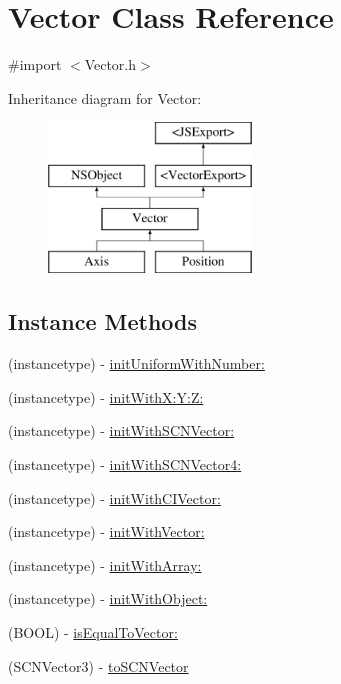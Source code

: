 \hypertarget{interface_vector}{}\section{Vector Class Reference}
\label{interface_vector}


{\ttfamily \#import $<$Vector.\+h$>$}

Inheritance diagram for Vector\+:\begin{figure}[H]
\begin{center}
\leavevmode
\includegraphics[height=4.000000cm]{interface_vector}
\end{center}
\end{figure}
\subsection*{Instance Methods}
\begin{DoxyCompactItemize}
\item 
(instancetype) -\/ \hyperlink{interface_vector_ab2f9f8cb5aed3938085bc658411084ac}{init\+Uniform\+With\+Number\+:}
\item 
(instancetype) -\/ \hyperlink{interface_vector_a678be7532656d3c2833b2acdb940be9b}{init\+With\+X\+:\+Y\+:\+Z\+:}
\item 
(instancetype) -\/ \hyperlink{interface_vector_a00a140fdfab0f2a9f511bfd9368b05c1}{init\+With\+S\+C\+N\+Vector\+:}
\item 
(instancetype) -\/ \hyperlink{interface_vector_a8ab40101d7921d728166653208d8b6f1}{init\+With\+S\+C\+N\+Vector4\+:}
\item 
(instancetype) -\/ \hyperlink{interface_vector_a6fefc863106ef83a124762d23f065a1a}{init\+With\+C\+I\+Vector\+:}
\item 
(instancetype) -\/ \hyperlink{interface_vector_a14175d2914f746e3d8260e5b922509db}{init\+With\+Vector\+:}
\item 
(instancetype) -\/ \hyperlink{interface_vector_aace155088fd47dfedb5cd7bcabf1c884}{init\+With\+Array\+:}
\item 
(instancetype) -\/ \hyperlink{interface_vector_a5b1248a4bbfca1c381e87a2ccae4b4a4}{init\+With\+Object\+:}
\item 
(B\+O\+O\+L) -\/ \hyperlink{interface_vector_a0867ba26e13ae0c8c3c0f58250d7e2e2}{is\+Equal\+To\+Vector\+:}
\item 
(S\+C\+N\+Vector3) -\/ \hyperlink{interface_vector_ada9cf0a0a9b4612fdbeb9815f5897d07}{to\+S\+C\+N\+Vector}
\end{DoxyCompactItemize}
